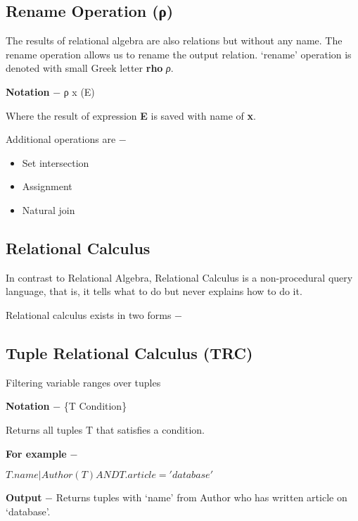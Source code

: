 \documentclass[]{article}
\providecommand{\tightlist}{%
  \setlength{\itemsep}{0pt}\setlength{\parskip}{0pt}}
\begin{document}
\hypertarget{rename-operation-ux3c1}{%
\subsection{Rename Operation (ρ)}\label{rename-operation-ux3c1}}

The results of relational algebra are also relations but without any
name. The rename operation allows us to rename the output relation.
`rename' operation is denoted with small Greek letter \textbf{rho}
\emph{ρ}.

\textbf{Notation} − ρ x (E)

Where the result of expression \textbf{E} is saved with name of
\textbf{x}.

Additional operations are −

\begin{itemize}
\tightlist
\item
  Set intersection
\item
  Assignment
\item
  Natural join
\end{itemize}

\hypertarget{relational-calculus}{%
\subsection{Relational Calculus}\label{relational-calculus}}

In contrast to Relational Algebra, Relational Calculus is a
non-procedural query language, that is, it tells what to do but never
explains how to do it.

Relational calculus exists in two forms −

\hypertarget{tuple-relational-calculus-trc}{%
\subsection{Tuple Relational Calculus
(TRC)}\label{tuple-relational-calculus-trc}}

Filtering variable ranges over tuples

\textbf{Notation} − \{T \textbar{} Condition\}

Returns all tuples T that satisfies a condition.

\textbf{For example} −

\({ T.name | Author(T) AND T.article = 'database' }\)

\textbf{Output} − Returns tuples with `name' from Author who has written
article on `database'.
\end{document}
